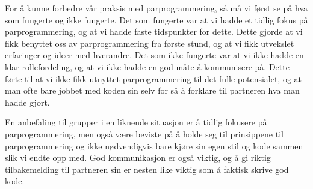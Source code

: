 For å kunne forbedre vår praksis med parprogrammering, så må vi først se på hva som fungerte og ikke fungerte.
Det som fungerte var at vi hadde et tidlig fokus på parprogrammering, og at vi hadde faste tidspunkter for dette.
Dette gjorde at vi fikk benyttet oss av parprogrammering fra første stund, og at vi fikk utvekslet erfaringer og ideer med hverandre.
Det som ikke fungerte var at vi ikke hadde en klar rollefordeling, og at vi ikke hadde en god måte å kommunisere på.
Dette førte til at vi ikke fikk utnyttet parprogrammering til det fulle potensialet, og at man ofte bare jobbet med koden sin selv for så å forklare til partneren hva man hadde gjort.

En anbefaling til grupper i en liknende situasjon er å tidlig fokusere på parprogrammering, men også være beviste på å holde seg til prinsippene til parprogrammering og ikke nødvendigvis bare kjøre sin egen stil og kode sammen slik vi endte opp med.
God kommunikasjon er også viktig, og å gi riktig tilbakemelding til partneren sin er nesten like viktig som å faktisk skrive god kode.
